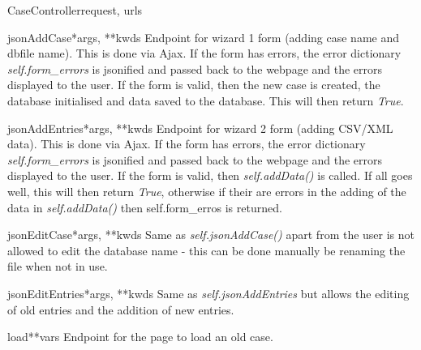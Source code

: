 \documentclass[letterpaper,10pt,english]{manual}
\begin{document}
\begin{classdesc}{CaseController}{request, urls}
\hypertarget{webscavator.controllers.caseController.CaseController.jsonAddCase}{}\begin{methoddesc}{jsonAddCase}{*args, **kwds}
Endpoint for wizard 1 form (adding case name and dbfile name). This is done via Ajax. 
If the form has errors, the error dictionary \emph{self.form\_errors} is jsonified 
and passed back to the webpage and the errors displayed to the user. 
If the form is valid, then the new case is created, the database initialised 
and data saved to the database. This will then return \emph{True}.
\end{methoddesc}

\hypertarget{webscavator.controllers.caseController.CaseController.jsonAddEntries}{}\begin{methoddesc}{jsonAddEntries}{*args, **kwds}
Endpoint for wizard 2 form (adding CSV/XML data). This is done via Ajax. 
If the form has errors, the error dictionary \emph{self.form\_errors} is jsonified 
and passed back to the webpage and the errors displayed to the user. 
If the form is valid, then \emph{self.addData()} is called. 
If all goes well, this will then return \emph{True}, otherwise if their are errors in 
the adding of the data in \emph{self.addData()} then self.form\_erros is returned.
\end{methoddesc}

\hypertarget{webscavator.controllers.caseController.CaseController.jsonEditCase}{}\begin{methoddesc}{jsonEditCase}{*args, **kwds}
Same as \emph{self.jsonAddCase()} apart from the user is not allowed to edit the database name - 
this can be done manually be renaming the file when not in use.
\end{methoddesc}

\hypertarget{webscavator.controllers.caseController.CaseController.jsonEditEntries}{}\begin{methoddesc}{jsonEditEntries}{*args, **kwds}
Same as \emph{self.jsonAddEntries} but allows the editing of old entries and the addition
of new entries.
\end{methoddesc}

\hypertarget{webscavator.controllers.caseController.CaseController.load}{}\begin{methoddesc}{load}{**vars}
Endpoint for the page to load an old case.
\end{methoddesc}


\end{classdesc}
\end{document}
